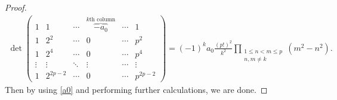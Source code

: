 \documentclass[10pt,a4paper]{amsart}
\begin{document}
\begin{proof}
\begin{align*}
        \det\begin{pmatrix}
				1&1&\cdots&\overbrace{-a_0}^{\text{$k$th column}}&\cdots&1\\
				1&2^2&\cdots&0&\cdots&p^2\\
				1&2^4&\cdots&0&\cdots&p^4\\
				\vdots&\vdots&\ddots&\vdots&\cdots&\vdots\\
				1&2^{2p-2}&\cdots&0&\cdots&p^{2p-2}
			\end{pmatrix}=(-1)^{k}a_0\frac{(p!)^2}{k^2}\prod_{\substack{1\le n<m\le p\\ n, m\ne k}}(m^2-n^2).
    \end{align*}
    Then by using \eqref{a0} and performing further calculations, we are done.
\end{proof}
\end{document}
